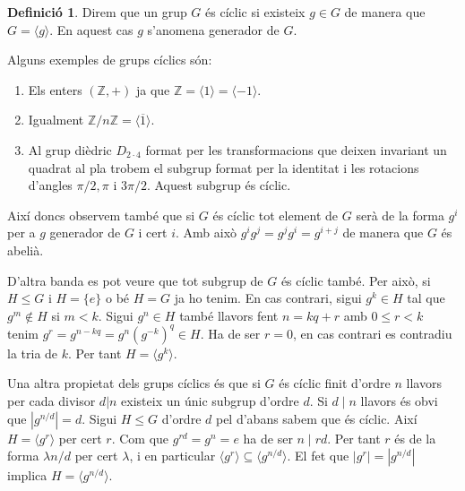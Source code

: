 \documentclass[a4paper,11pt]{report}
\renewcommand{\div}{\mid}
\newcommand{\ordre}[1]{|#1|}
\renewcommand{\bar}{\overline}
\theoremstyle{theorem}
\theoremstyle{definition}
\newtheorem{definicio}{\normalfont\sffamily\bfseries Definició}[section]
\begin{document}
\begin{definicio}
	Direm que un grup $G$ és cíclic si existeix $g\in G$ de manera que $G=\langle g\rangle$. En aquest cas $g$ s'anomena generador de $G$.
\end{definicio}
Alguns exemples de grups cíclics són:
\begin{enumerate}
	\item Els enters $(\mathbb{Z,+})$ ja que $\mathbb{Z}=\langle1\rangle=\langle-1\rangle$.
	\item Igualment $\mathbb{Z}/n\mathbb{Z}=\langle\bar{1}\rangle$.
	\item Al grup dièdric $D_{2\cdot4}$ format per les transformacions que deixen invariant un quadrat al pla trobem el subgrup format per la identitat i les rotacions d'angles $\pi/2,\pi$ i $3\pi/2$. Aquest subgrup és cíclic.
\end{enumerate}

Així doncs observem també que si $G$ és cíclic tot element de $G$ serà de la forma $g^i$ per a $g$ generador de $G$ i cert $i$. Amb això $g^i g^j=g^j g^i=g^{i+j}$ de manera que $G$ és abelià.

 D'altra banda es pot veure que tot subgrup de $G$ és cíclic també. Per això, si $H\leq G$ i $H=\{e\}$ o bé $H=G$ ja ho tenim. En cas contrari, sigui $g^k\in H$ tal que $g^m\notin H$ si $m<k$. Sigui $g^n\in H$ també llavors fent $n=kq+r$ amb $0\leq r<k$ tenim $g^r=g^{n-kq}=g^n(g^{-k})^q\in H$. Ha de ser $r=0$, en cas contrari es contradiu la tria de $k$. Per tant $H=\langle g^k\rangle$.

Una altra propietat dels grups cíclics és que si $G$ és cíclic finit d'ordre $n$ llavors per cada divisor $d|n$ existeix un únic subgrup d'ordre $d$. Si $d\div n$ llavors és obvi que $\ordre{g^{n/d}}=d$. Sigui $H\leq G$ d'ordre $d$ pel d'abans sabem que és cíclic. Així $H=\langle g^r\rangle$ per cert $r$. Com que $g^{rd}=g^n=e$ ha de ser $n\div rd$. Per tant $r$ és de la forma $\lambda n/d$ per cert $\lambda$, i en particular $\langle g^r\rangle\subseteq\langle g^{n/d}\rangle$. El fet que $\ordre{g^r}=\ordre{g^{n/d}}$ implica $H=\langle g^{n/d}\rangle$.
\end{document}
